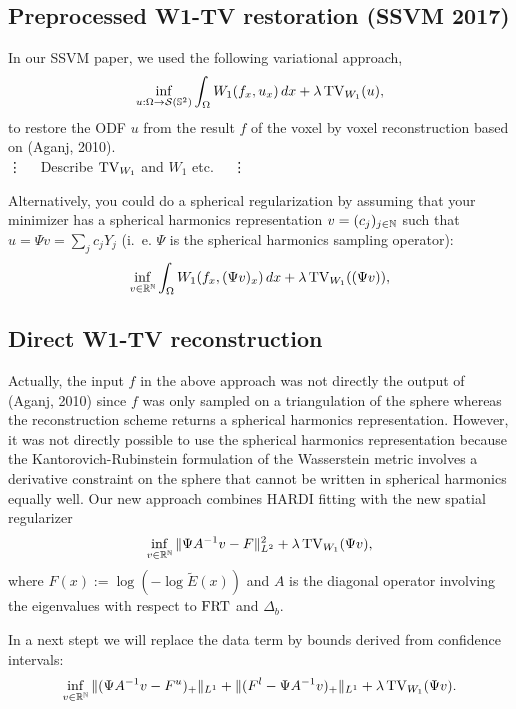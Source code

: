 
\subsection{Preprocessed W1-TV restoration (SSVM 2017)}

In our SSVM paper, we used the following variational approach,
\[
    \inf_{u:\Omega \to \mathcal{S}(\mathbb{S}^2)}
        \int_\Omega W_1(f_x,u_x) \,d x + \lambda \operatorname{TV}_{W_1}(u),
\]
to restore the ODF $u$ from the result $f$ of the voxel by voxel reconstruction
based on (Aganj, 2010).\\

\vspace{1cm}
\hspace{1cm}\vdots~~ Describe $\operatorname{TV}_{W_1}$ and $W_1$ etc. ~~\vdots
\vspace{1cm}

Alternatively, you could do a spherical regularization by assuming that your
minimizer has a spherical harmonics representation $v = (c_j)_{j \in \mathbb{N}}$
such that $u = \Psi v = \sum_j c_j Y_j$ (i.~e. $\Psi$ is the spherical harmonics
sampling operator):
\[
    \inf_{v \in \mathbb{R}^{\mathbb{N}}}
        \int_\Omega W_1(f_x, (\Psi v)_x) \,d x + \lambda \operatorname{TV}_{W_1}((\Psi v)),
\]

\subsection{Direct W1-TV reconstruction}

Actually, the input $f$ in the above approach was not directly the output of
(Aganj, 2010) since $f$ was only sampled on a triangulation of the sphere
whereas the reconstruction scheme returns a spherical harmonics representation.
However, it was not directly possible to use the spherical harmonics
representation because the Kantorovich-Rubinstein formulation of the
Wasserstein metric involves a derivative constraint on the sphere that cannot
be written in spherical harmonics equally well.
Our new approach combines HARDI fitting with the new spatial regularizer
\[
    \inf_{v \in \mathbb{R}^{\mathbb{N}}}
        \| \Psi A^{-1}v - F \|_{L^2}^2 + \lambda \operatorname{TV}_{W_1}(\Psi v),
\]
where $F(x) := \log(-\log\tilde E(x))$ and $A$ is the diagonal operator involving
the eigenvalues with respect to $\operatorname{FRT}$ and $\Delta_b$.

In a next stept we will replace the data term by bounds derived from
confidence intervals:
\[
    \inf_{v \in \mathbb{R}^{\mathbb{N}}}
        \| (\Psi A^{-1}v - F^u)_+ \|_{L^1}  + \| (F^l - \Psi A^{-1}v)_+ \|_{L^1}
        + \lambda \operatorname{TV}_{W_1}(\Psi v).
\]
